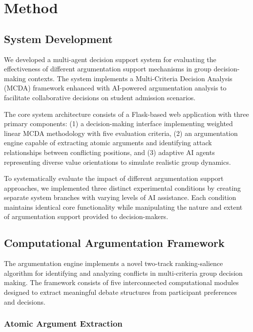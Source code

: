 \documentclass[conference]{IEEEtran}
\begin{document}
\section{Method}

\subsection{System Development}

We developed a multi-agent decision support system for evaluating the effectiveness of different argumentation support mechanisms in group decision-making contexts. The system implements a Multi-Criteria Decision Analysis (MCDA) framework enhanced with AI-powered argumentation analysis to facilitate collaborative decisions on student admission scenarios.

The core system architecture consists of a Flask-based web application with three primary components: (1) a decision-making interface implementing weighted linear MCDA methodology with five evaluation criteria, (2) an argumentation engine capable of extracting atomic arguments and identifying attack relationships between conflicting positions, and (3) adaptive AI agents representing diverse value orientations to simulate realistic group dynamics.

To systematically evaluate the impact of different argumentation support approaches, we implemented three distinct experimental conditions by creating separate system branches with varying levels of AI assistance. Each condition maintains identical core functionality while manipulating the nature and extent of argumentation support provided to decision-makers.

\subsection{Computational Argumentation Framework}

The argumentation engine implements a novel two-track ranking-salience algorithm for identifying and analyzing conflicts in multi-criteria group decision making. The framework consists of five interconnected computational modules designed to extract meaningful debate structures from participant preferences and decisions.

\subsubsection{Atomic Argument Extraction}
\end{document}
